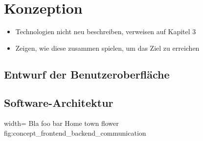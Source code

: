 \chapter{Konzeption}\label{konzeption}

\blindtext[1]

\begin{itemize}
\tightlist
\item
  Technologien nicht neu beschreiben, verweisen auf Kapitel 3
\item
  Zeigen, wie diese zusammen spielen, um das Ziel zu erreichen
\end{itemize}

\section{Entwurf der
Benutzeroberfläche}\label{entwurf-der-benutzeroberfluxe4che}

\section{Software-Architektur}\label{software-architektur}

   {width=\textwidth}
   {Bla foo bar}
   {Home town flower}
   {fig:concept_frontend_backend_communication}
